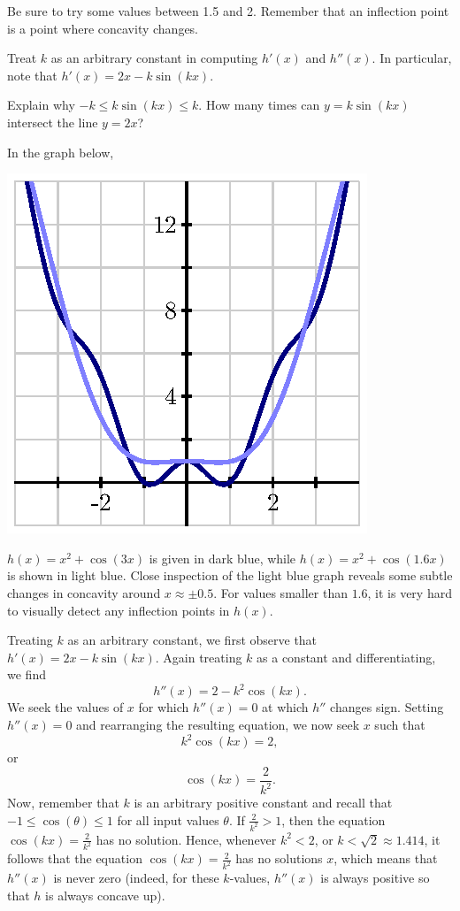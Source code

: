 \begin{bighint}
	\ba
		\item Be sure to try some values between 1.5 and 2.  Remember that an inflection point is a point where concavity changes.
		\item Treat $k$ as an arbitrary constant in computing $h'(x)$ and $h''(x)$.  In particular, note that $h'(x) = 2x - k\sin(kx)$.
		\item Explain why $-k \le k\sin(kx) \le k$.  How many times can $y = k\sin(kx)$ intersect the line $y = 2x$?
	\ea
\end{bighint}
\begin{activitySolution}
	\ba
		\item In the graph below,
\begin{center}
\includegraphics{figures/3_1_Act3Soln.eps} 
\end{center}
$h(x) = x^2 + \cos(3x)$ is given in dark blue, while $h(x) = x^2 + \cos(1.6x)$ is shown in light blue.  Close inspection of the light blue graph reveals some subtle changes in concavity around $x \approx \pm 0.5$.  For values smaller than $1.6$, it is very hard to visually detect any inflection points in $h(x)$.		
		\item Treating $k$ as an arbitrary constant, we first observe that $h'(x) = 2x - k\sin(kx)$. Again treating $k$ as a constant and differentiating, we find
		$$h''(x) = 2 - k^2\cos(kx).$$
		We seek the values of $x$ for which $h''(x) = 0$ at which $h''$ changes sign.  Setting $h''(x) = 0$ and rearranging the resulting equation, we now seek $x$ such that 
		$$k^2 \cos(kx) = 2,$$
		or
		$$\cos(kx) = \frac{2}{k^2}.$$
		Now, remember that $k$ is an arbitrary positive constant and recall that $-1 \le \cos(\theta) \le 1$ for all input values $\theta$.  If $\frac{2}{k^2} > 1$, then the equation $\cos(kx) = \frac{2}{k^2}$ has no solution.  Hence, whenever $k^2 < 2$, or $k < \sqrt{2} \approx 1.414$, it follows that the equation $\cos(kx) = \frac{2}{k^2}$ has no solutions $x$, which means that $h''(x)$ is never zero (indeed, for these $k$-values, $h''(x)$ is always positive so that $h$ is always concave up).
		

\end{activitySolution}
